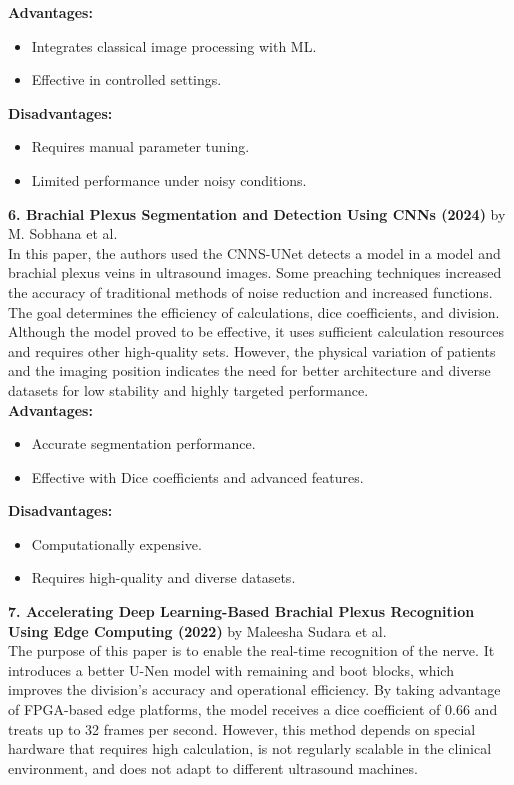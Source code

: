 \documentclass[12pt]{article}
\begin{document}
\textbf{Advantages:}
\begin{itemize}
    \item Integrates classical image processing with ML.
    \item Effective in controlled settings.
\end{itemize}

\textbf{Disadvantages:}
\begin{itemize}
    \item Requires manual parameter tuning.
    \item Limited performance under noisy conditions.
\end{itemize}

\vspace{10pt}

\noindent \textbf{6. Brachial Plexus Segmentation and Detection Using CNNs (2024)} by M. Sobhana et al.\\
In this paper, the authors used the
CNNS-UNet detects a model in a model and brachial plexus veins in ultrasound
images. Some preaching techniques increased the accuracy of traditional methods of noise reduction and increased functions. The goal determines the efficiency of calculations, dice coefficients,
and division. Although the model proved to be effective, it uses sufficient calculation resources
and requires other high-quality sets. However, the physical variation of patients and the imaging
position indicates the need for better architecture and diverse datasets for low stability and highly
targeted performance.\\

\textbf{Advantages:}
\begin{itemize}
    \item Accurate segmentation performance.
    \item Effective with Dice coefficients and advanced features.
\end{itemize}

\textbf{Disadvantages:}
\begin{itemize}
    \item Computationally expensive.
    \item Requires high-quality and diverse datasets.
\end{itemize}

\vspace{10pt}

\noindent \textbf{7. Accelerating Deep Learning-Based Brachial Plexus Recognition Using Edge Computing (2022)} by Maleesha Sudara et al.\\
The purpose of this paper
is to enable the real-time recognition of the nerve. It introduces a better U-Nen model with remaining and boot blocks, which improves the division’s accuracy and operational efficiency. By taking
advantage of FPGA-based edge platforms, the model receives a dice coefficient of 0.66 and treats
up to 32 frames per second. However, this method depends on special hardware that requires high
calculation, is not regularly scalable in the clinical environment, and does not adapt to different
ultrasound machines.\\
\end{document}
